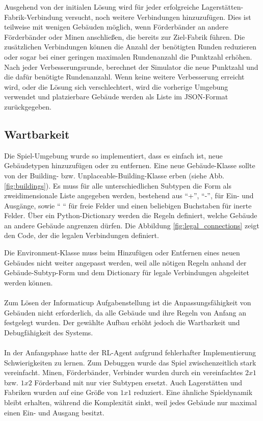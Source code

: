 Ausgehend von der initialen Lösung wird für jeder erfolgreiche Lagerstätten-Fabrik-Verbindung versucht, noch weitere Verbindungen hinzuzufügen. Dies ist teilweise mit wenigen Gebäuden möglich, wenn Förderbänder an andere Förderbänder oder Minen anschließen, die bereits zur Ziel-Fabrik führen. Die zusätzlichen Verbindungen können die Anzahl der benötigten Runden reduzieren oder sogar bei einer geringen maximalen Rundenanzahl die Punktzahl erhöhen. 
Nach jeder Verbesserungsrunde, berechnet der Simulator die neue Punktzahl und die dafür benötigte Rundenanzahl. Wenn keine weitere Verbesserung erreicht wird, oder die Lösung sich verschlechtert, wird die vorherige Umgebung verwendet und platzierbare Gebäude werden als Liste im JSON-Format zurückgegeben.

\subsection{Wartbarkeit}
Die Spiel-Umgebung wurde so implementiert, dass es einfach ist, neue Gebäudetypen hinzuzufügen oder zu entfernen. Eine neue Gebäude-Klasse sollte von der Building- bzw. Unplaceable-Building-Klasse erben (siehe Abb. \ref{fig:buildings}). Es muss für alle unterschiedlichen Subtypen die Form als zweidimensionale Liste angegeben werden, bestehend aus “+”, “-”, für Ein- und Ausgänge, sowie “ “ für freie Felder und einen beliebigen Buchstaben für inerte Felder. 
Über ein Python-Dictionary werden die Regeln definiert, welche Gebäude an andere Gebäude angrenzen dürfen. 
Die Abbildung \ref{fig:legal_connections} zeigt den Code, der die legalen Verbindungen definiert.

Die Environment-Klasse muss beim Hinzufügen oder Entfernen eines neuen Gebäudes nicht weiter angepasst werden, weil alle nötigen Regeln anhand der Gebäude-Subtyp-Form und dem Dictionary für legale Verbindungen abgeleitet werden können.
\\\\
Zum Lösen der Informaticup Aufgabenstellung ist die Anpassungsfähigkeit von Gebäuden nicht erforderlich, da alle Gebäude und ihre Regeln von Anfang an festgelegt wurden. 
Der gewählte Aufbau erhöht jedoch die Wartbarkeit und Debugfähigkeit des Systems. 
\\\\
In der Anfangsphase hatte der RL-Agent aufgrund fehlerhafter Implementierung Schwierigkeiten zu lernen. Zum Debuggen wurde das Spiel zwischenzeitlich stark vereinfacht. Minen, Förderbänder, Verbinder wurden durch ein vereinfachtes $2x1$ bzw. $1x2$ Förderband mit nur vier Subtypen ersetzt. Auch Lagerstätten und Fabriken wurden auf eine Größe von $1x1$ reduziert. Eine ähnliche Spieldynamik bleibt erhalten, während die Komplexität sinkt, weil jedes Gebäude nur maximal einen Ein- und Ausgang besitzt. 




